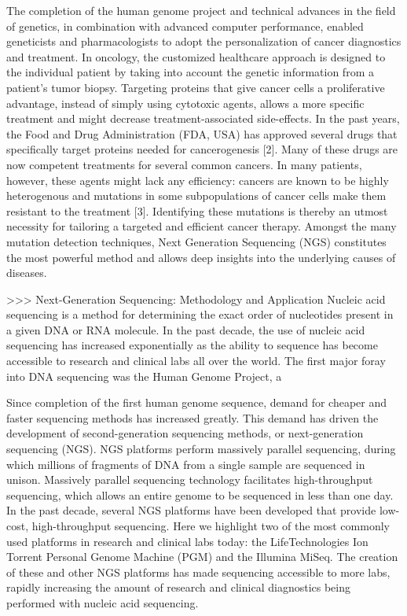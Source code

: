 The completion of the human genome project and technical advances in the field of genetics, in combination with advanced computer performance, enabled geneticists and pharmacologists to adopt the personalization of cancer diagnostics and treatment. In oncology, the customized healthcare approach is designed to the individual patient by taking into account the genetic information from a patient’s tumor biopsy. Targeting proteins that give cancer cells a proliferative advantage, instead of simply using cytotoxic agents, allows a more specific treatment and might decrease treatment-associated side-effects. In the past years, the Food and Drug Administration (FDA, USA) has approved several drugs that specifically target proteins needed for cancerogenesis [2]. Many of these drugs are now competent treatments for several common cancers. In many patients, however, these agents might lack any efficiency: cancers are known to be highly heterogenous and mutations in some subpopulations of cancer cells make them resistant to the treatment [3]. Identifying these mutations is thereby an utmost necessity for tailoring a targeted and efficient cancer therapy. Amongst the many mutation detection techniques, Next Generation Sequencing (NGS) constitutes the most powerful method and allows deep insights into the underlying causes of diseases.



>>> Next-Generation Sequencing: Methodology and Application
Nucleic acid sequencing is a method for determining the exact order of nucleotides present in a given DNA or RNA molecule. In the past decade, the use of nucleic acid sequencing has increased exponentially as the ability to sequence has become accessible to research and clinical labs all over the world. The first major foray into DNA sequencing was the Human Genome Project, a %

Since completion of the first human genome sequence, demand for cheaper and faster sequencing methods has increased greatly. This demand has driven the development of second-generation sequencing methods, or next-generation sequencing (NGS). NGS platforms perform massively parallel sequencing, during which millions of fragments of DNA from a single sample are sequenced in unison. Massively parallel sequencing technology facilitates high-throughput sequencing, which allows an entire genome to be sequenced in less than one day. In the past decade, several NGS platforms have been developed that provide low-cost, high-throughput sequencing. Here we highlight two of the most commonly used platforms in research and clinical labs today: the LifeTechnologies Ion Torrent Personal Genome Machine (PGM) and the Illumina MiSeq. The creation of these and other NGS platforms has made sequencing accessible to more labs, rapidly increasing the amount of research and clinical diagnostics being performed with nucleic acid sequencing.

